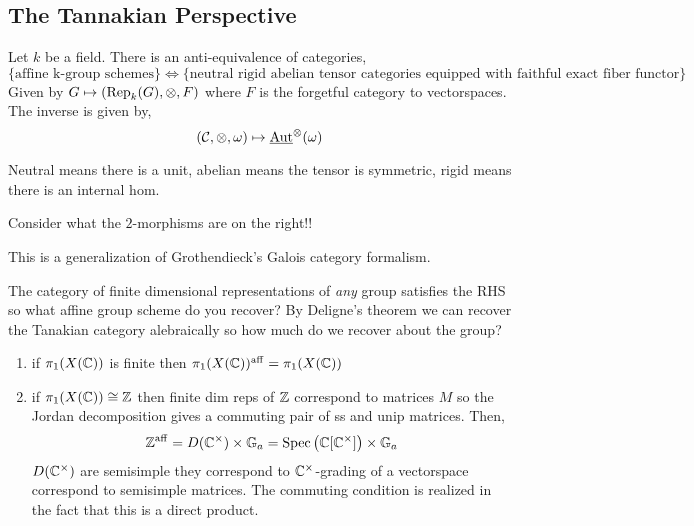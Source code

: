\documentclass[12pt]{article}
\begin{document}
\subsection{The Tannakian Perspective}

\begin{theorem}[Tannaka]
Let $k$ be a field. There is an anti-equivalence of categories,
\[ \{ \text{affine k-group schemes} \} \iff \{ \text{neutral rigid abelian tensor categories equipped with faithful exact fiber functor} \} \]
Given by $G \mapsto (\mathrm{Rep}_k(G), \otimes, F)$ where $F$ is the forgetful category to vectorspaces. The inverse is given by,
\[ (\mathcal{C}, \otimes, \omega) \mapsto \underline{\mathrm{Aut}}^{\otimes}(\omega) \]
\end{theorem}

\begin{rmk}
Neutral means there is a unit, abelian means the tensor is symmetric, rigid means there is an internal hom. 
\end{rmk}

\begin{rmk}
Consider what the $2$-morphisms are on the right!!
\end{rmk}

\begin{rmk}
This is a generalization of Grothendieck's Galois category formalism. 
\end{rmk}

\newcommand{\aff}{\mathrm{aff}}

\begin{example}
The category of finite dimensional representations of \textit{any} group satisfies the RHS so what affine group scheme do you recover? By Deligne's theorem we can recover the Tanakian category alebraically so how much do we recover about the group?
\begin{enumerate}
\item if $\pi_1(X(\mathbb{C}))$ is finite then $\pi_1(X(\CC))^{\aff} = \pi_1(X(\CC))$
\item if $\pi_1(X(\mathbb{C})) \cong \mathbb{Z}$ then finite dim reps of $\mathbb{Z}$ correspond to matrices $M$ so the Jordan decomposition gives a commuting pair of ss and unip matrices. Then,
\[ \Z^{\aff} = D(\CC^\times) \times \Ga = \Spec{\CC[\CC^\times]} \times \Ga \]
$D(\mathbb{C}^\times)$ are semisimple they correspond to $\mathbb{C}^\times$-grading of a vectorspace correspond to semisimple matrices. The commuting condition is realized in the fact that this is a direct product.
\end{enumerate}
\end{example}
\end{document}
